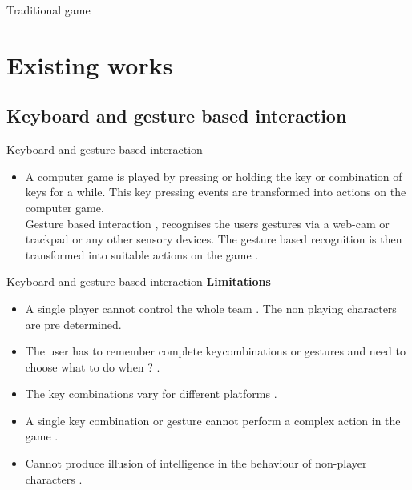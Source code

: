\documentclass{beamer}
\begin{document}
\begin{frame}{Traditional game}
\begin{figure}[ht]
\end{figure}
\end{frame}


\section{Existing works}
\subsection{Keyboard and gesture based interaction }
\begin{frame}{Keyboard and gesture based interaction }
\begin{itemize}
\item
A computer game is played by pressing or holding the  key or combination of keys for a while. This key pressing  events are transformed into actions on the computer game. \\ Gesture based interaction , recognises the users gestures via a web-cam or trackpad or any other  sensory devices. The gesture based recognition is then transformed into suitable actions on the game .
\end{itemize}

\end{frame}


\begin{frame}{Keyboard and gesture based interaction }
\textbf{Limitations}

\begin{itemize}
\item
A single player cannot control the whole team . The non playing characters are pre determined.
\end{itemize}

\begin{itemize}
\item			
			The user has to remember complete keycombinations or gestures and need to choose what to do when ? .
\end{itemize}

\begin{itemize}
\item
			The key combinations  vary for different platforms .
\end{itemize}

\begin{itemize}
\item
			A single key combination or gesture  cannot perform a complex action in the game .
\end{itemize}

\begin{itemize}
\item
			Cannot produce illusion of intelligence in the behaviour of non-player characters .
\end{itemize}
\end{frame}
\end{document}
